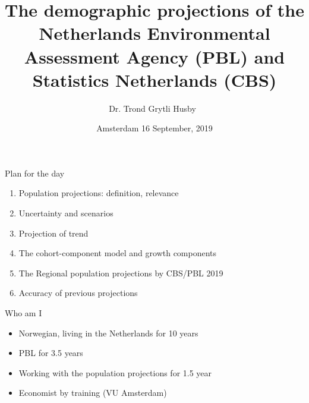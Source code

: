 \documentclass[final, 12pt, aspectratio=169, xcolor={dvipsnames}]{beamer}
\title[PEARL]{The demographic projections of the Netherlands Environmental Assessment Agency (PBL) and Statistics Netherlands (CBS)}
\subtitle[PEARL]{}
\author[T. Husby]{Dr. Trond Grytli Husby\ }
\institute[PBL]{
  Netherlands Environmental Assesment Agency (PBL) \\[5ex]
  \texttt{trond.husby@pbl.nl}
}
\date[\today]{Amsterdam 16 September, 2019}
\begin{document}
\beamertemplatenavigationsymbolsempty

{

  \begin{frame}
    \titlepage
  \end{frame}
}



\begin{frame}{Plan for the day}  
  \begin{enumerate}
  \item Population projections: definition, relevance
  \item Uncertainty and scenarios
  \item Projection of trend
  \item The cohort-component model and growth components
  \item The Regional population projections by CBS/PBL 2019 \href{https://themasites.pbl.nl/regionale-bevolkingsprognose/}{}
  \item Accuracy of previous projections
    \end{enumerate}
\end{frame}


\begin{frame}{Who am I}
  \begin{itemize}
  \item Norwegian, living in the Netherlands for 10 years 
  \item PBL for 3.5 years
  \item Working with the population projections for 1.5 year
    \item Economist by training (VU Amsterdam)
    \end{itemize}
\end{frame}

\end{document}
